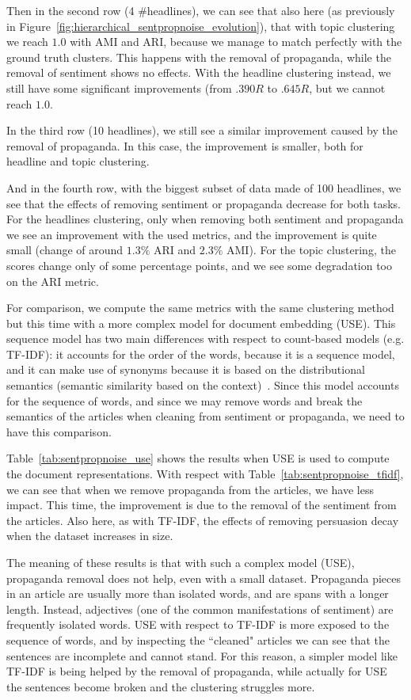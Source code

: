 Then in the second row (4 \#headlines), we can see that also here (as previously in Figure~\ref{fig:hierarchical_sentpropnoise_evolution}), that with topic clustering we reach $1.0$ with AMI and ARI, because we manage to match perfectly with the ground truth clusters.
This happens with the removal of propaganda, while the removal of sentiment shows no effects.
With the headline clustering instead, we still have some significant improvements (from $.390R$ to $.645R$, but we cannot reach $1.0$.

In the third row (10 headlines), we still see a similar improvement caused by the removal of propaganda. In this case, the improvement is smaller, both for headline and topic clustering.

And in the fourth row, with the biggest subset of data made of 100 headlines, we see that the effects of removing sentiment or propaganda decrease for both tasks. For the headlines clustering, only when removing both sentiment and propaganda we see an improvement with the used metrics, and the improvement is quite small (change of around $1.3\%$ ARI and $2.3\%$ AMI). For the topic clustering, the scores change only of some percentage points, and we see some degradation too on the ARI metric.

For comparison, we compute the same metrics with the same clustering method but this time with a more complex model for document embedding (USE). This sequence model has two main differences with respect to count-based models (e.g. TF-IDF): it accounts for the order of the words, because it is a sequence model, and it can make use of synonyms because it is based on the distributional semantics (semantic similarity based on the context)~\citep{firth1957synopsis}. Since this model accounts for the sequence of words, and since we may remove words and break the semantics of the articles when cleaning from sentiment or propaganda, we need to have this comparison.

Table~\ref{tab:sentpropnoise_use} shows the results when USE is used to compute the document representations.
With respect with Table~\ref{tab:sentpropnoise_tfidf}, we can see that when we remove propaganda from the articles, we have less impact. This time, the improvement is due to the removal of the sentiment from the articles.
Also here, as with TF-IDF, the effects of removing persuasion decay when the dataset increases in size.

The meaning of these results is that with such a complex model (USE),
propaganda removal does not help, even with a small dataset. Propaganda pieces in an article are usually more than isolated words, and are spans with a longer length. Instead, adjectives (one of the common manifestations of sentiment) are frequently isolated words. USE with respect to TF-IDF is more exposed to the sequence of words, and by inspecting the ``cleaned" articles we can see that the sentences are incomplete and cannot stand. For this reason, a simpler model like TF-IDF is being helped by the removal of propaganda, while actually for USE the sentences become broken and the clustering struggles more.

